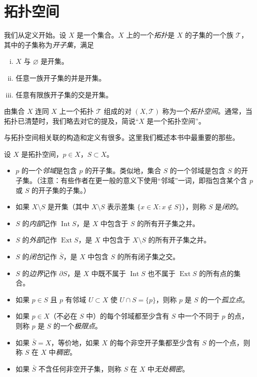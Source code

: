 \documentclass[../../main.tex]{subfiles}
\begin{document}
\section{拓扑空间}\label{section:appA-topological-spaces}

我们从定义开始。设 $X$ 是一个集合。$X$ 上的一个\emph{拓扑}是 $X$ 的子集的一个族 $\mathcal T$，其中的子集称为\emph{开子集}，满足
\begin{enumerate}[(i)]
\item $X$ 与 $\varnothing$ 是开集。
\item 任意一族开子集的并是开集。
\item 任意有限族开子集的交是开集。
\end{enumerate}
由集合 $X$ 连同 $X$ 上一个拓扑 $\mathcal T$ 组成的对 $(X,\mathcal T)$ 称为一个\emph{拓扑空间}。通常，当拓扑已清楚时，我们略去对它的提及，简说“$X$ 是一个拓扑空间”。

与拓扑空间相关联的构造和定义有很多。这里我们概述本书中最重要的那些。

设 $X$ 是拓扑空间，$p\in X$，$S\subset X$。
\begin{itemize}
\item $p$ 的一个\emph{邻域}是包含 $p$ 的开子集。类似地，集合 $S$ 的一个邻域是包含 $S$ 的开子集。（注意：有些作者在更一般的意义下使用“邻域”一词，即指包含某个含 $p$ 或 $S$ 的开子集的子集。）
\item 如果 $X\setminus S$ 是开集（其中 $X\setminus S$ 表示差集 $\{x\in X:x\notin S\}$），则称 $S$ 是\emph{闭的}。
\item $S$ 的\emph{内部}记作 $\operatorname{Int}S$，是 $X$ 中包含于 $S$ 的所有开子集之并。
\item $S$ 的\emph{外部}记作 $\operatorname{Ext}S$，是 $X$ 中包含于 $X\setminus S$ 的所有开子集之并。
\item $S$ 的\emph{闭包}记作 $\bar S$，是 $X$ 中包含 $S$ 的所有闭子集之交。
\item $S$ 的\emph{边界}记作 $\partial S$，是 $X$ 中既不属于 $\operatorname{Int}S$ 也不属于 $\operatorname{Ext}S$ 的所有点的集合。
\item 如果 $p\in S$ 且 $p$ 有邻域 $U\subset X$ 使 $U\cap S=\{p\}$，则称 $p$ 是 $S$ 的一个\emph{孤立点}。
\item 如果 $p\in X$（不必在 $S$ 中）的每个邻域都至少含有 $S$ 中一个不同于 $p$ 的点，则称 $p$ 是 $S$ 的一个\emph{极限点}。
\item 如果 $\bar S=X$，等价地，如果 $X$ 的每个非空开子集都至少含有 $S$ 的一个点，则称 $S$ 在 $X$ 中\emph{稠密}。
\item 如果 $\bar S$ 不含任何非空开子集，则称 $S$ 在 $X$ 中\emph{无处稠密}。
\end{itemize}
\end{document}
